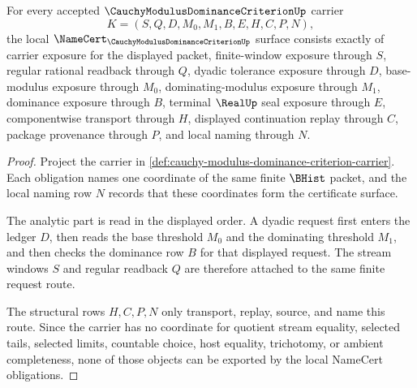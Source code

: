 \begin{theorem}
\label{thm:cauchy-modulus-dominance-criterion-namecert-obligations}
For every accepted $\CauchyModulusDominanceCriterionUp$ carrier
$$
K=(S,Q,D,M_0,M_1,B,E,H,C,P,N),
$$
the local $\NameCert_{\CauchyModulusDominanceCriterionUp}$ surface consists exactly of carrier exposure for the displayed packet, finite-window exposure through $S$, regular rational readback through $Q$, dyadic tolerance exposure through $D$, base-modulus exposure through $M_0$, dominating-modulus exposure through $M_1$, dominance exposure through $B$, terminal $\RealUp$ seal exposure through $E$, componentwise transport through $H$, displayed continuation replay through $C$, package provenance through $P$, and local naming through $N$.
\end{theorem}
\begin{proof}
Project the carrier in \autoref{def:cauchy-modulus-dominance-criterion-carrier}. Each obligation names one coordinate of the same finite $\BHist$ packet, and the local naming row $N$ records that these coordinates form the certificate surface.

The analytic part is read in the displayed order. A dyadic request first enters the ledger $D$, then reads the base threshold $M_0$ and the dominating threshold $M_1$, and then checks the dominance row $B$ for that displayed request. The stream windows $S$ and regular readback $Q$ are therefore attached to the same finite request route.

The structural rows $H,C,P,N$ only transport, replay, source, and name this route. Since the carrier has no coordinate for quotient stream equality, selected tails, selected limits, countable choice, host equality, trichotomy, or ambient completeness, none of those objects can be exported by the local NameCert obligations.
\end{proof}

